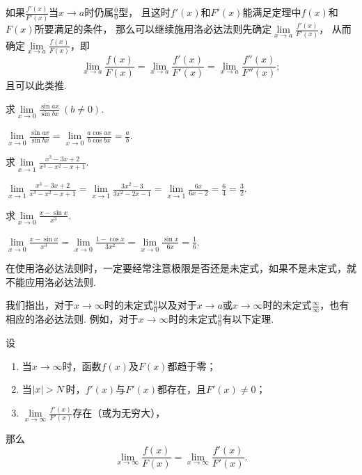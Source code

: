 如果\(\frac{f'(x)}{F'(x)}\)当\(x \to a\)时仍属\(\frac{0}{0}\)型，
且这时\(f'(x)\)和\(F'(x)\)能满足定理中\(f(x)\)和\(F(x)\)所要满足的条件，
那么可以继续施用洛必达法则先确定\(\lim\limits_{x \to a} \frac{f'(x)}{F'(x)}\)，
从而确定\(\lim\limits_{x \to a} \frac{f(x)}{F(x)}\)，即\[
	\lim\limits_{x \to a} \frac{f(x)}{F(x)}
	= \lim\limits_{x \to a} \frac{f'(x)}{F'(x)}
	= \lim\limits_{x \to a} \frac{f''(x)}{F''(x)};
\]
且可以此类推.

\begin{example}
\def\l{\lim\limits_{x\to0}}
\def\a{\l\frac{\sin ax}{\sin bx}}
求\(\a\ (b \neq 0)\).
\begin{solution}
\(\a = \l\frac{a \cos ax}{b \cos bx} = \frac{a}{b}\).
\end{solution}
\end{example}

\begin{example}
\def\l{\lim\limits_{x\to1}}
\def\a{\l\frac{x^3-3x+2}{x^3-x^2-x+1}}
求\(\a\).
\begin{solution}
\(\a = \l\frac{3x^2-3}{3x^2-2x-1} = \l\frac{6x}{6x-2} = \frac{6}{4} = \frac{3}{2}\).
\end{solution}
\end{example}

\begin{example}
\def\l{\lim\limits_{x\to0}}
\def\a{\l\frac{x-\sin x}{x^3}}
求\(\a\).
\begin{solution}
\(\a = \l\frac{1-\cos x}{3x^2} = \l\frac{\sin x}{6x} = \frac{1}{6}\).
\end{solution}
\end{example}

在使用洛必达法则时，一定要经常注意极限是否还是未定式，如果不是未定式，就不能应用洛必达法则.

我们指出，对于\(x\to\infty\)时的未定式\(\frac{0}{0}\)以及对于\(x \to a\)或\(x\to\infty\)时的未定式\(\frac{\infty}{\infty}\)，也有相应的洛必达法则.
例如，对于\(x\to\infty\)时的未定式\(\frac{0}{0}\)有以下定理.
\begin{theorem}\label{theorem:微分中值定理.洛必达法则2}
\def\l{\lim\limits_{x\to\infty}}
设\begin{enumerate}
	\item 当\(x\to\infty\)时，函数\(f(x)\)及\(F(x)\)都趋于零；
	\item 当\(\abs{x}>N\)时，\(f'(x)\)与\(F'(x)\)都存在，且\(F'(x) \neq 0\)；
	\item \(\l\frac{f'(x)}{F'(x)}\)存在（或为无穷大），
\end{enumerate}那么\[
	\l\frac{f(x)}{F(x)} = \l\frac{f'(x)}{F'(x)}.
\]
\end{theorem}

